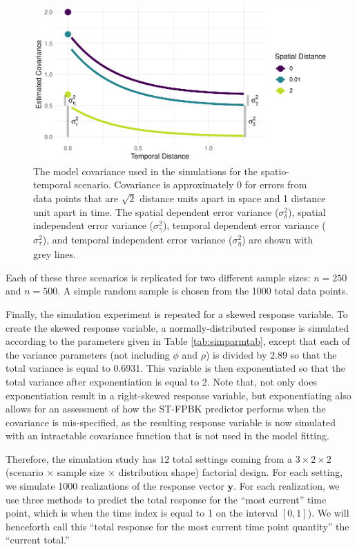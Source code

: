 \documentclass[smallextended]{svjour3}       %
\begin{document}
\begin{figure}
\centering
\includegraphics{preprint_springer_files/figure-latex/unnamed-chunk-15-1.pdf}
\caption{\label{fig:simcovplot} The model covariance used in the
simulations for the spatio-temporal scenario. Covariance is
approximately 0 for errors from data points that are \(\sqrt2\) distance
units apart in space and 1 distance unit apart in time. The spatial
dependent error variance (\(\sigma^2_{\delta}\)), spatial independent
error variance (\(\sigma^2_{\gamma}\)), temporal dependent error
variance (\(\sigma^2_{\tau}\)), and temporal independent error variance
(\(\sigma^2_{\eta}\)) are shown with grey lines.}
\end{figure}

Each of these three scenarios is replicated for two different sample
sizes: \(n = 250\) and \(n = 500\). A simple random sample is chosen
from the 1000 total data points.

Finally, the simulation experiment is repeated for a skewed response
variable. To create the skewed response variable, a normally-distributed
response is simulated according to the parameters given in Table
\ref{tab:simparmtab}, except that each of the variance parameters (not
including \(\phi\) and \(\rho\)) is divided by 2.89 so that the total
variance is equal to 0.6931. This variable is then exponentiated so that
the total variance after exponentiation is equal to 2. Note that, not
only does exponentiation result in a right-skewed response variable, but
exponentiating also allows for an assessment of how the ST-FPBK
predictor performs when the covariance is mis-specified, as the
resulting response variable is now simulated with an intractable
covariance function that is not used in the model fitting.

Therefore, the simulation study has \(12\) total settings coming from a
\(3 \times 2 \times 2\) (scenario \(\times\) sample size \(\times\)
distribution shape) factorial design. For each setting, we simulate 1000
realizations of the response vector \(\mathbf{y}\). For each
realization, we use three methods to predict the total response for the
``most current'' time point, which is when the time index is equal to 1
on the interval \([0, 1]\)). We will henceforth call this ``total
response for the most current time point quantity'' the ``current
total.''
\end{document}
